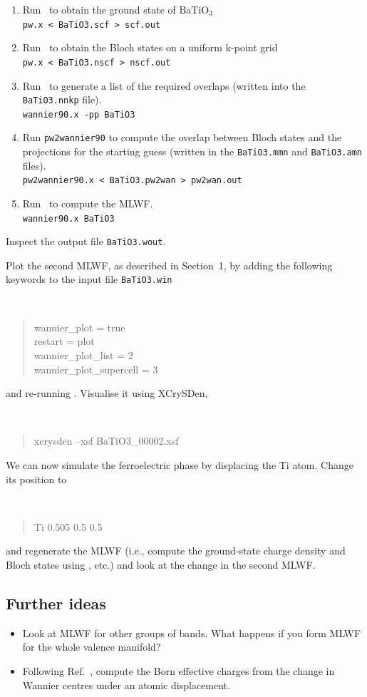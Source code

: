 \documentclass[a4paper,11pt,twoside]{article}
\begin{document}
\begin{enumerate}
\item Run \pwscf\ to obtain the ground state of BaTiO$_3$\\
{\tt pw.x < BaTiO3.scf > scf.out}

\item Run \pwscf\ to obtain the Bloch states on a uniform k-point grid\\
{\tt pw.x < BaTiO3.nscf > nscf.out}

\item Run \wannier\ to generate a list of the required overlaps (written
  into the {\tt BaTiO3.nnkp} file).\\ 
{\tt wannier90.x -pp BaTiO3}

\item Run {\tt pw2wannier90} to compute the overlap between Bloch
  states and the projections for the starting guess (written in the
  {\tt BaTiO3.mmn} and {\tt BaTiO3.amn} files).\\  
{\tt pw2wannier90.x < BaTiO3.pw2wan > pw2wan.out}

\item Run \wannier\ to compute the MLWF.\\
{\tt wannier90.x BaTiO3}
\end{enumerate}

Inspect the output file {\tt BaTiO3.wout}. 

Plot the second MLWF, as described in Section~1, by adding the
following keywords to the input file {\tt BaTiO3.win}
{\tt
\begin{quote}
wannier\_plot = true\\
restart = plot\\
wannier\_plot\_list = 2\\
wannier\_plot\_supercell = 3
\end{quote} }
and re-running \wannier. Visualise it using XCrySDen,
{\tt
\begin{quote}
xcrysden --xsf BaTiO3\_00002.xsf
\end{quote} }

We can now simulate the ferroelectric phase by displacing the Ti
  atom. Change its position to 
{\tt
\begin{quote}
Ti 0.505 0.5 0.5
\end{quote}
}
and regenerate the MLWF (i.e., compute the ground-state charge
density and Bloch states using \pwscf, etc.) and look at the change in
the second MLWF.

\subsection*{Further ideas}
\begin{itemize}
\item Look at MLWF for other groups of bands. What happens if you form
  MLWF for the whole valence manifold?

\item Following Ref.~\cite{BaTiO3}, compute the Born effective charges from the
  change in Wannier centres under an atomic displacement. 
\end{itemize}
\end{document}
